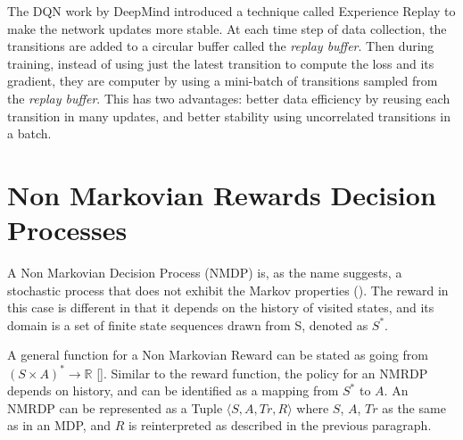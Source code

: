\documentclass{article}
\begin{document}
The DQN work by DeepMind introduced a technique called Experience Replay to make the network updates more stable. At each time step of data collection, the transitions are added to a circular buffer called the \textit{replay buffer}. Then during training, instead of using just the latest transition to compute the loss and its gradient, they are computer by using a mini-batch of transitions sampled from the \textit{replay buffer}. This has two advantages: better data efficiency by reusing each transition in many updates, and better stability using uncorrelated transitions in a batch.





\section{Non Markovian Rewards Decision Processes}%
A Non Markovian Decision Process (NMDP) is, as the name suggests, a stochastic process that does not exhibit the Markov properties (\cite{Thiebaux06}). The reward in this case is different in that it depends on the history of visited states, and its domain is a set of finite state sequences drawn from S, denoted as $S^*$. 

A general function for a Non Markovian Reward can be stated as going from $(S \times A)^* \rightarrow \mathbb{R}$ [\cite{camacho_chen_sanner_mcilraith_2017}]. Similar to the reward function, the policy for an NMRDP depends on history, and can be identified as a mapping from $S^*$ to $A$. An NMRDP can be represented as a Tuple $\langle S, A, Tr, R \rangle$ where $S$, $A$, $Tr$ as the same as in an MDP, and $R$ is reinterpreted as described in the previous paragraph.  
\end{document}
